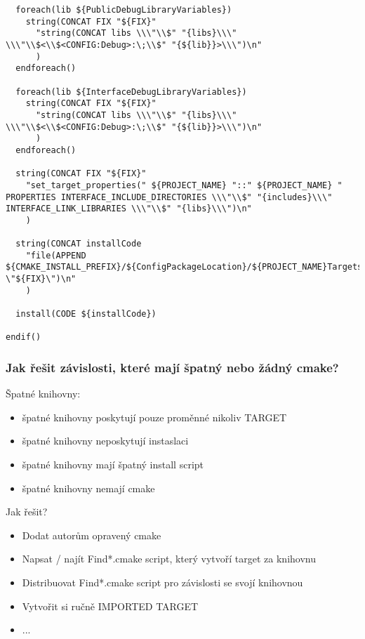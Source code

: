 \begin{frame}[fragile]
{\begin{verbatim}
  foreach(lib ${PublicDebugLibraryVariables})
    string(CONCAT FIX "${FIX}"
      "string(CONCAT libs \\\"\\$" "{libs}\\\" \\\"\\$<\\$<CONFIG:Debug>:\;\\$" "{${lib}}>\\\")\n"
      )
  endforeach()
  
  foreach(lib ${InterfaceDebugLibraryVariables})
    string(CONCAT FIX "${FIX}"
      "string(CONCAT libs \\\"\\$" "{libs}\\\" \\\"\\$<\\$<CONFIG:Debug>:\;\\$" "{${lib}}>\\\")\n"
      )
  endforeach()
  
  string(CONCAT FIX "${FIX}"
    "set_target_properties(" ${PROJECT_NAME} "::" ${PROJECT_NAME} " PROPERTIES INTERFACE_INCLUDE_DIRECTORIES \\\"\\$" "{includes}\\\" INTERFACE_LINK_LIBRARIES \\\"\\$" "{libs}\\\")\n"
    )
  
  string(CONCAT installCode 
    "file(APPEND ${CMAKE_INSTALL_PREFIX}/${ConfigPackageLocation}/${PROJECT_NAME}Targets.cmake \"${FIX}\")\n"
    )
  
  install(CODE ${installCode})

endif()
\end{verbatim}
}
\end{frame}

\begin{frame}[fragile]
\frametitle{Jak řešit závislosti, které mají špatný nebo žádný cmake?}
  Špatné knihovny:
	\begin{itemize}
  \item špatné knihovny poskytují pouze proměnné nikoliv TARGET
  \item špatné knihovny neposkytují instaslaci
  \item špatné knihovny mají špatný install script
  \item špatné knihovny nemají cmake
	\end{itemize}
  Jak řešit?
	\begin{itemize}
  \item Dodat autorům opravený cmake
  \item Napsat / najít Find*.cmake script, který vytvoří target za knihovnu
  \item Distribuovat Find*.cmake script pro závislosti se svojí knihovnou
  \item Vytvořit si ručně IMPORTED TARGET
  \item ...
	\end{itemize}
\end{frame}

